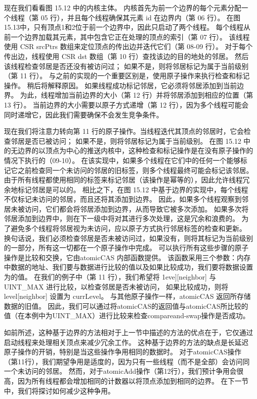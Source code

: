 现在我们看看图 15.12 中的内核主体。 
内核首先为前一个边界的每个元素分配一个线程（第 05 行），并且每个线程确保其元素 id 在边界内（第 06 行）。 
在图15.13中，只有顶点1和2位于前一个边界中，因此只启动了两个线程。 
每个线程从前一个边界加载其元素，其中包含它正在处理的顶点的索引（第 07 行）。 
该线程使用 CSR srcPtrs 数组来定位顶点的传出边并迭代它们（第 08-09 行）。 
对于每个传出边，线程使用 CSR dst 数组（第 10 行）查找该边的目的地处的邻居。 然后该线程检查邻居是否还没有被访问过； 
如果不是，则将邻居标记为属于当前级别（第 11 行）。 与之前的实现的一个重要区别是，使用原子操作来执行检查和标记操作。 
稍后将解释原因。 如果线程成功标记邻居，它必须将邻居添加到当前边界。 
为此，线程增加当前边界的大小（第 12 行）并将邻居添加到相应的位置（第 13 行）。 
当前边界的大小需要以原子方式递增（第 12 行），因为多个线程可能会同时递增它，因此我们需要确保不会发生竞争条件。

现在我们将注意力转向第 11 行的原子操作。当线程迭代其顶点的邻居时，它会检查邻居是否已被访问； 
如果不是，则将邻居标记为属于当前级别。 
在图 15.12 中的无边界的以顶点为中心的推送内核中，这种检查和标记操作是在没有原子操作的情况下执行的（09-10）。 
在该实现中，如果多个线程在它们中的任何一个能够标记它之前检查同一个未访问的邻居的旧标签，则多个线程最终可能会标记该邻居。 
由于所有线程都使用相同的标签来标记邻居（该操作是幂等的），因此允许线程冗余地标记邻居是可以的。 
相比之下，在图 15.12 中基于边界的实现中，每个线程不仅标记未访问的邻居，而且还将其添加到边界。 
因此，如果多个线程观察到邻居未被访问，它们都会将邻居添加到边界，从而导致它被多次添加。 
如果多次将邻居添加到边界中，则在下一级中将对其进行多次处理，这是冗余和浪费的。 
为了避免多个线程将邻居视为未访问，应以原子方式执行邻居标签的检查和更新。 
换句话说，我们必须检查邻居是否未被访问过，如果没有，则将其标记为当前级别的一部分，所有这一切都在一个原子操作中完成。 
可以执行所有这些步骤的原子操作是比较和交换，它由atomicCAS 内部函数提供。 
该函数采用三个参数：内存中数据的地址、我们要与数据进行比较的值以及如果比较成功，我们要将数据设置为的值。 
在我们的例子中（第 11 行），我们希望将 1eve][neighbor] 与 UINT\_MAX 进行比较，以检查邻居是否未被访问，
如果比较成功，则将 level[neighbor] 设置为 currLevel。 与其他原子操作一样，atomicCAS 返回所存储数据的旧值。 
因此，我们可以通过将atomicCAS的返回值与atomicCAS所比较的值（在本例中为UINT\_MAX）进行比较来检查compareand-swap操作是否成功。

如前所述，这种基于边界的方法相对于上一节中描述的方法的优点在于，它仅通过启动线程来处理相关顶点来减少冗余工作。 
这种基于边界的方法的缺点是长延迟原子操作的开销，特别是当这些操作争用相同的数据时。 
对于atomicCAS操作（第11行），我们期望争用是适度的，因为只有一些线程（而不是全部）会访问同一个未访问的邻居。 
然而，对于atomicAdd操作（第12行），我们预计争用会很高，因为所有线程都会增加相同的计数器以将顶点添加到相同的边界。 
在下一节中，我们将探讨如何减少这种争用。


